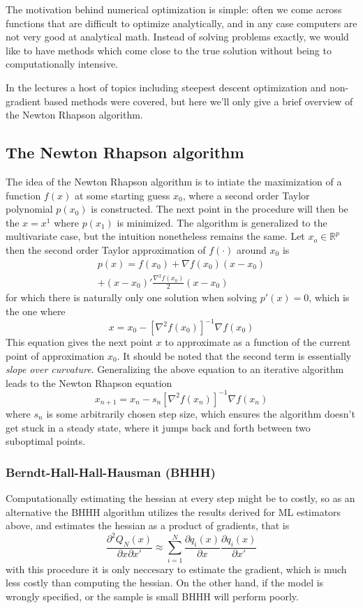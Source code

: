 The motivation behind numerical optimization is simple: often we come across functions that are difficult to optimize analytically, and in any case computers are not very good at analytical math. Instead of solving problems exactly, we would like to have methods which come close to the true solution without being to computationally intensive.

In the lectures a host of topics including steepest descent optimization and non-gradient based methods were covered, but here we'll only give a brief overview of the Newton Rhapson algorithm.

\subsection{The Newton Rhapson algorithm}
The idea of the Newton Rhapson algorithm is to intiate the maximization of a function $f(x)$ at some starting guess $x_0$, where a second order Taylor polynomial $p(x_0)$ is constructed. The next point in the procedure will then be the $x=x^1$ where $p(x_1)$ is minimized. The algorithm is generalized to the multivariate case, but the intuition nonetheless remains the same. Let $x_o \in \mathbb{R}^p$ then the second order Taylor approximation of $f(\cdot)$ around $x_0$ is
\begin{multline}
p(x) = f(x_0) + \nabla f(x_0) (x- x_0) \\+ (x-x_0)'\frac{\nabla^2 f(x_0)}{2}(x-x_0)
\end{multline}
for which there is naturally only one solution when solving $p'(x) = 0$, which is the one where
\begin{equation}
x = x_0 - [\nabla^2 f(x_0)]^{-1} \nabla f(x_0)
\end{equation}
This equation gives the next point $x$ to approximate as a function of the current point of approximation $x_0$. It should be noted that the second term is essentially \textit{slope over curvature}. Generalizing the above equation to an iterative algorithm leads to the Newton Rhapson equation
\begin{equation}
x_{n+1} = x_n - s_n [\nabla^2 f(x_n)]^{-1} \nabla f(x_n)
\end{equation}
where $s_n$ is some arbitrarily chosen step size, which ensures the algorithm doesn't get stuck in a steady state, where it jumps back and forth between two suboptimal points.

\subsubsection{Berndt-Hall-Hall-Hausman (BHHH)}
Computationally estimating the hessian at every step might be to costly, so as an alternative the BHHH algorithm utilizes the results derived for ML estimators above, and estimates the hessian as a product of gradients, that is
\begin{equation}
\frac{\partial^2 Q_N(x)}{\partial x \partial x'} \approx \sum_{i=1}^N \frac{\partial q_i(x)}{\partial x} \frac{\partial q_i(x)}{\partial x'}
\end{equation}
with this procedure it is only neccesary to estimate the gradient, which is much less costly than computing the hessian. On the other hand, if the model is wrongly specified, or the sample is small BHHH will perform poorly.
